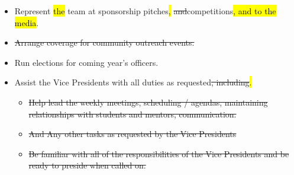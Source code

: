 \documentclass[12pt, a4paper]{article}
\begin{document}
\begin{itemize}
\item Represent \hl{the }team at sponsorship pitches\hl{,} \st{and}competitions\hl{, and to the media}.
\item \st{Arrange coverage for community outreach events.}
\item Run elections for coming year’s officers.  
\item Assist the Vice Presidents with all duties as requested\st{, including}\hl{.}
	\begin{itemize}
		\item \st{Help lead the weekly meetings, scheduling / agendas, maintaining relationships with students and mentors, communication.}
		\item \st{And Any other tasks as requested by the Vice Presidents}
		\item \st{Be familiar with all of the responsibilities of the Vice Presidents and be ready to preside when called on.}
	\end{itemize}
\end{itemize}
\end{document}
